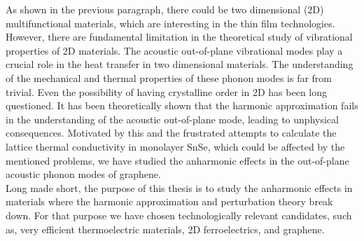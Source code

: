 As shown in the previous paragraph, there could be two dimensional (2D) multifunctional materials, which are 
interesting in the thin film technologies. However, there are fundamental limitation in the theoretical study of 
vibrational properties of 2D materials. The acoustic out-of-plane vibrational modes play a crucial 
role\cite{lindsay2010flexural} in the heat transfer in two dimensional materials. The understanding of the mechanical and thermal properties of these phonon modes is far from trivial. Even the possibility of having crystalline order 
in 2D has been long questioned\cite{landau_statistical_physics,mermin1968crystalline}. It has been theoretically 
shown that the harmonic approximation fails\cite{katsnelson2013graphene} in the understanding of the acoustic 
out-of-plane mode, leading to unphysical consequences. Motivated by this and the frustrated attempts to calculate 
the lattice thermal conductivity in monolayer SnSe, which could be affected by the mentioned problems, we have 
studied the anharmonic effects in the out-of-plane acoustic phonon modes of graphene. \\

Long made short, the purpose of this thesis is to study the anharmonic effects in materials where the harmonic 
approximation and perturbation theory break down. For that purpose we have chosen technologically relevant 
candidates, such as, very efficient thermoelectric materials, 2D ferroelectrics, and graphene.
